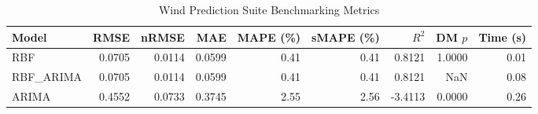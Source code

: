 \begin{table}[htbp]
\centering
\caption{Wind Prediction Suite Benchmarking Metrics}
\label{tab:wind_prediction_summary}
\begin{tabular}{lrrrrrrrr}
\toprule
Model & RMSE & nRMSE & MAE & MAPE (\%) & sMAPE (\%) & $R^2$ & DM $p$ & Time (s) \\
\midrule
RBF & 0.0705 & 0.0114 & 0.0599 & 0.41 & 0.41 & 0.8121 & 1.0000 & 0.01 \\
RBF_ARIMA & 0.0705 & 0.0114 & 0.0599 & 0.41 & 0.41 & 0.8121 & NaN & 0.08 \\
ARIMA & 0.4552 & 0.0733 & 0.3745 & 2.55 & 2.56 & -3.4113 & 0.0000 & 0.26 \\
\bottomrule
\end{tabular}
\end{table}
